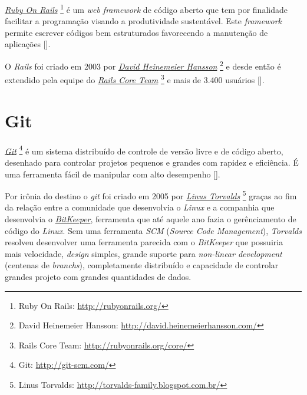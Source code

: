 \emph{\href{http://rubyonrails.org/}{Ruby On Rails}} \footnote{Ruby On Rails: \url{http://rubyonrails.org/}}
é um \emph{web framework} de código aberto que tem por finalidade facilitar a programação
visando a produtividade sustentável. Este \emph{framework} permite escrever códigos bem estruturados
favorecendo a manutenção de aplicações [].

O \emph{Rails} foi criado em 2003 por \emph{\href{http://david.heinemeierhansson.com/}{David Heinemeier Hansson}}
\footnote{David Heinemeier Hansson: \url{http://david.heinemeierhansson.com/}} e desde então é extendido
pela equipe do \emph{\href{http://rubyonrails.org/core/}{Rails Core Team}}
\footnote{Rails Core Team: \url{http://rubyonrails.org/core/}} e mais de 3.400 usuários
[].

\section{Git}
\label{section:git}

\emph{\href{http://git-scm.com/}{Git}} \footnote{Git: \url{http://git-scm.com/}} é um sistema distribuído de
controle de versão livre e de código aberto, desenhado para controlar projetos pequenos e grandes com
rapidez e eficiência. É uma ferramenta fácil de manipular com alto desempenho [].

Por irônia do destino o \emph{git} foi criado em 2005 por
\emph{\href{http://torvalds-family.blogspot.com.br/}{Linus Torvalds}}
\footnote{Linus Torvalds: \url{http://torvalds-family.blogspot.com.br/}} graças ao fim da relação entre a
comunidade que desenvolvia o \emph{Linux} e a companhia que desenvolvia o
\emph{\href{http://www.bitkeeper.com/}{BitKeeper}}, ferramenta que até aquele ano fazia o gerênciamento de
código do \emph{Linux}. Sem uma ferramenta \emph{SCM} (\emph{Source Code Management}), \emph{Torvalds}
resolveu desenvolver uma ferramenta parecida com o \emph{BitKeeper} que possuiria mais velocidade,
\emph{design} simples, grande suporte para \emph{non-linear development} (centenas de \emph{branchs}),
completamente distribuído e capacidade de controlar grandes projeto com grandes quantidades de dados.

